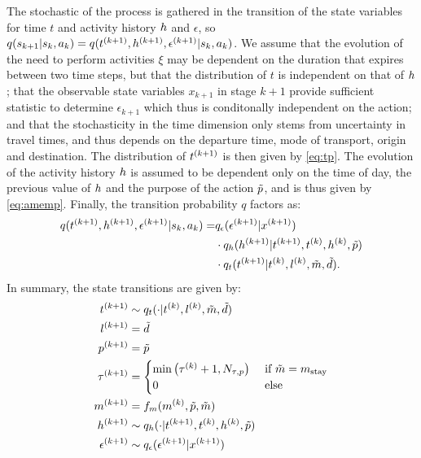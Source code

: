 The stochastic of the process is gathered in the transition of the state variables for time $t$ and activity history $h$ and $\epsilon$, so $q(s_{k+1}|s_{k},a_k) = q(t^{(k+1)},h^{(k+1)},\epsilon^{(k+1)}| s_{k},a_k)$. We assume that the evolution of the need to perform activities $\xi$ may be dependent on the duration that expires between two time steps, but that the distribution of $t$ is independent on that of $h$; that the observable state variables $x_{k+1}$ in stage $k+1$ provide sufficient statistic to determine $\epsilon_{k+1}$ which thus is conditonally independent on the action; and that the stochasticity in the time dimension only stems from uncertainty in travel times, and thus depends on the departure time, mode of transport, origin and destination. The distribution of $t^{(k+1)}$ is then given by \eqref{eq:tp}. The evolution of the activity history $h$ is assumed to be dependent only on the time of day, the previous value of $h$ and the purpose of the action $\tilde{p}$, and is thus given by \eqref{eq:amemp}. Finally, the transition probability $q$ factors as:
\begin{equation}
\begin{aligned}
	 q(t\ks{k+1},\amem\ks{k+1},\epsilon\ks{k+1}| \s{k},a_k) = & q_\epsilon(\epsilon\ks{k+1}|x\ks{k+1}) \\ &\cdot q_\amem(\amem\ks{k+1} | t\ks{k+1},t\ks{k}, \amem\ks{k},\act{p})\\&\cdot q_t (t\ks{k+1} | t\ks{k},l\ks{k},\act{m},\act{d}).
\end{aligned}
\end{equation}
In summary, the state transitions are given by:
\begin{subequations}
\begin{align}
t\ks{k+1} & \sim q_t (\cdot | t\ks{k},l\ks{k},\act{m},\act{d}) \label{eq:tp}\\
l\ks{k+1} &= \act{d} \\
p\ks{k+1} &= \act{p} \\
\atime\ks{k+1} & = \begin{cases}
                \min\big(\atime\ks{k} + 1,N_{\atime,p}\big) & \cif \act{m} = m_\text{stay} \\
                0 & \celse 
    \end{cases} \label{eq:atimeP} \\
    m\ks{k+1} &= f_m(m\ks{k},\act{p},\act{m}) \\
\amem\ks{k+1} & \sim q_\amem(\cdot | t\ks{k+1}, t\ks{k},\amem\ks{k},\act{p}) \label{eq:amemp} \\
\epsilon\ks{k+1} & \sim q_\epsilon(\epsilon\ks{k+1}|x\ks{k+1})
\end{align}
\end{subequations}


